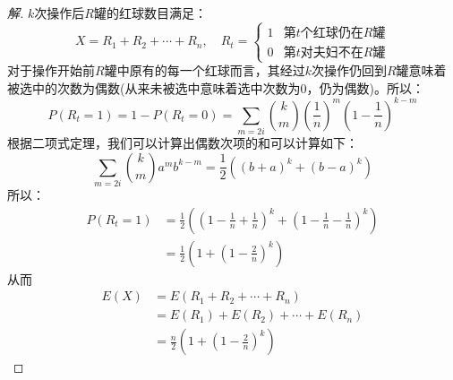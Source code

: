 \documentclass[12pt]{article}
\begin{document}
\begin{enumerate}
\begin{proof}[解]
	$k$次操作后$R$罐的红球数目满足：
	\begin{equation}
	X=R_1+R_2+\cdots+R_n,\quad R_t=\left\{
	\begin{array}{cc}
	1 & \mbox{第$t$个红球仍在$R$罐}\\
	0 & \mbox{第$t$对夫妇不在$R$罐}
	\end{array}
	\right.
	\end{equation}
	对于操作开始前$R$罐中原有的每一个红球而言，其经过$k$次操作仍回到$R$罐意味着被选中的次数为偶数(从来未被选中意味着选中次数为0，仍为偶数)。所以：
	\begin{equation}
	P(R_t=1)=1-P(R_t=0)=\sum_{m=2i}\binom{k}{m}\left(\frac{1}{n}\right)^m\left(1-\frac{1}{n}\right)^{k-m}
	\end{equation}
	根据二项式定理，我们可以计算出偶数次项的和可以计算如下：
	\begin{equation}
	\sum_{m=2i}\binom{k}{m}a^mb^{k-m}=\frac{1}{2}\left(\left(b+a\right)^k+\left(b-a\right)^k\right)
	\end{equation}
	所以：
	\begin{equation}\begin{aligned}
	P(R_t=1)&=\frac{1}{2}\left(\left(1-\frac{1}{n}+\frac{1}{n}\right)^k+\left(1-\frac{1}{n}-\frac{1}{n}\right)^k\right) \\
	&=\frac{1}{2}\left(1+\left(1-\frac{2}{n}\right)^k\right) 
	\end{aligned}
	\end{equation}
	从而
	\begin{equation}
	\begin{aligned}
	E(X)&=E(R_1+R_2+\cdots+R_n) \\
	&=E(R_1)+E(R_2)+\cdots+E(R_n) \\
	&=\frac{n}{2}\left(1+\left(1-\frac{2}{n}\right)^k\right)
	\end{aligned}
	\end{equation}
\end{proof}


\end{enumerate}
\end{document}
